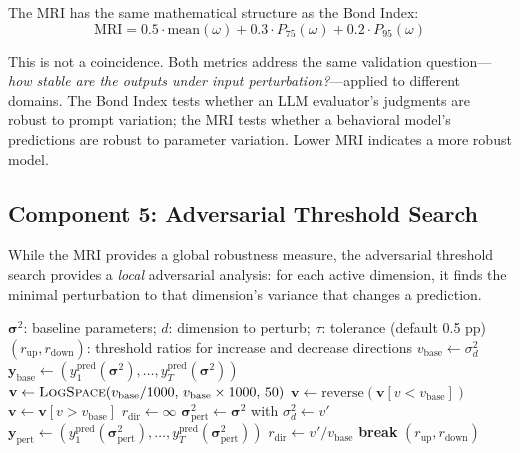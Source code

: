 \documentclass[12pt]{article}
\newcommand{\MRI}{\mathrm{MRI}}
\begin{document}
The MRI has the same mathematical structure as the Bond Index:
\begin{equation}
    \MRI = 0.5 \cdot \mathrm{mean}(\omega) + 0.3 \cdot P_{75}(\omega) + 0.2 \cdot P_{95}(\omega)
    \label{eq:mri}
\end{equation}

This is not a coincidence.  Both metrics address the same validation question---\emph{how stable are the outputs under input perturbation?}---applied to different domains.  The Bond Index tests whether an LLM evaluator's judgments are robust to prompt variation; the MRI tests whether a behavioral model's predictions are robust to parameter variation.  Lower MRI indicates a more robust model.

\subsection{Component 5: Adversarial Threshold Search}

While the MRI provides a global robustness measure, the adversarial threshold search provides a \emph{local} adversarial analysis: for each active dimension, it finds the minimal perturbation to that dimension's variance that changes a prediction.

\begin{algorithm}[H]
\caption{\textsc{AdversarialThresholdSearch}$(\boldsymbol{\sigma}^2, d, \tau)$}
\label{alg:adversarial}
\begin{algorithmic}[1]
\REQUIRE $\boldsymbol{\sigma}^2$: baseline parameters; $d$: dimension to perturb; $\tau$: tolerance (default 0.5 pp)
\ENSURE $(r_{\mathrm{up}}, r_{\mathrm{down}})$: threshold ratios for increase and decrease directions
\STATE $v_{\mathrm{base}} \leftarrow \sigma_d^2$
\STATE $\mathbf{y}_{\mathrm{base}} \leftarrow (y_1^{\mathrm{pred}}(\boldsymbol{\sigma}^2), \ldots, y_T^{\mathrm{pred}}(\boldsymbol{\sigma}^2))$
    \STATE $\mathbf{v} \leftarrow \textsc{LogSpace}(v_{\mathrm{base}} / 1000, \, v_{\mathrm{base}} \times 1000, \, 50)$
        \STATE $\mathbf{v} \leftarrow \text{reverse}(\mathbf{v}[v < v_{\mathrm{base}}])$
    \ELSE
        \STATE $\mathbf{v} \leftarrow \mathbf{v}[v > v_{\mathrm{base}}]$
    \ENDIF
    \STATE $r_{\mathrm{dir}} \leftarrow \infty$ 
        \STATE $\boldsymbol{\sigma}_{\mathrm{pert}}^2 \leftarrow \boldsymbol{\sigma}^2$ with $\sigma_d^2 \leftarrow v'$
        \STATE $\mathbf{y}_{\mathrm{pert}} \leftarrow (y_1^{\mathrm{pred}}(\boldsymbol{\sigma}_{\mathrm{pert}}^2), \ldots, y_T^{\mathrm{pred}}(\boldsymbol{\sigma}_{\mathrm{pert}}^2))$
            \STATE $r_{\mathrm{dir}} \leftarrow v' / v_{\mathrm{base}}$
            \STATE \textbf{break}
        \ENDIF
    \ENDFOR
\ENDFOR
\RETURN $(r_{\mathrm{up}}, r_{\mathrm{down}})$
\end{algorithmic}
\end{algorithm}
\end{document}
